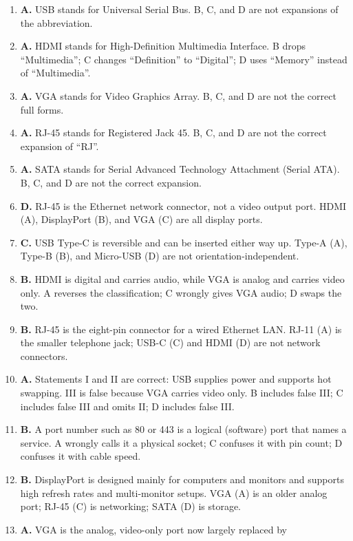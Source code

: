 \begin{enumerate}[label=\textbf{Q\arabic*.}, leftmargin=*]
\item \textbf{A.} USB stands for Universal Serial Bus. B, C, and D are not
  expansions of the abbreviation.
\item \textbf{A.} HDMI stands for High-Definition Multimedia Interface. B
  drops ``Multimedia''; C changes ``Definition'' to ``Digital''; D uses
  ``Memory'' instead of ``Multimedia''.
\item \textbf{A.} VGA stands for Video Graphics Array. B, C, and D are not the
  correct full forms.
\item \textbf{A.} RJ-45 stands for Registered Jack 45. B, C, and D are not the
  correct expansion of ``RJ''.
\item \textbf{A.} SATA stands for Serial Advanced Technology Attachment (Serial
  ATA). B, C, and D are not the correct expansion.
\item \textbf{D.} RJ-45 is the Ethernet network connector, not a video output
  port. HDMI (A), DisplayPort (B), and VGA (C) are all display ports.
\item \textbf{C.} USB Type-C is reversible and can be inserted either way up.
  Type-A (A), Type-B (B), and Micro-USB (D) are not orientation-independent.
\item \textbf{B.} HDMI is digital and carries audio, while VGA is analog and
  carries video only. A reverses the classification; C wrongly gives VGA
  audio; D swaps the two.
\item \textbf{B.} RJ-45 is the eight-pin connector for a wired Ethernet LAN.
  RJ-11 (A) is the smaller telephone jack; USB-C (C) and HDMI (D) are not
  network connectors.
\item \textbf{A.} Statements I and II are correct: USB supplies power and
  supports hot swapping. III is false because VGA carries video only. B
  includes false III; C includes false III and omits II; D includes false III.
\item \textbf{B.} A port number such as 80 or 443 is a logical (software) port
  that names a service. A wrongly calls it a physical socket; C confuses it
  with pin count; D confuses it with cable speed.
\item \textbf{B.} DisplayPort is designed mainly for computers and monitors
  and supports high refresh rates and multi-monitor setups. VGA (A) is an
  older analog port; RJ-45 (C) is networking; SATA (D) is storage.
\item \textbf{A.} VGA is the analog, video-only port now largely replaced by

\end{enumerate}
